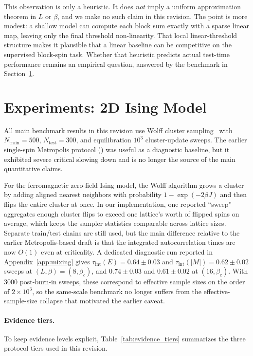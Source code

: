 \documentclass[12pt,a4paper]{memoir}
\begin{document}
This observation is only a heuristic.  It does \emph{not} imply a uniform
approximation theorem in $L$ or $\beta$, and we make no such claim in this
revision.  The point is more modest: a shallow model can compute each block sum
exactly with a sparse linear map, leaving only the final threshold
non-linearity.  That local linear-threshold structure makes it plausible that a
linear baseline can be competitive on the supervised block-spin task.
Whether that heuristic predicts actual test-time performance remains an
empirical question, answered by the benchmark in Section~\ref{sec:ising_exp}.

\section{Experiments: 2D Ising Model}
\label{sec:ising_exp}

All main benchmark results in this revision use Wolff cluster
sampling~\citep{wolff1989,swendsen1987,sokal1997,newman1999,binder2010} with
$N_{\mathrm{train}}=500$, $N_{\mathrm{test}}=300$, and equilibration $10^3$
cluster-update sweeps.  The earlier single-spin Metropolis protocol
(\citealp{metropolis1953,hastings1970}) was useful as a diagnostic baseline,
but it exhibited severe critical slowing down and is no longer the source of
the main quantitative claims.

For the ferromagnetic zero-field Ising model, the Wolff algorithm grows a
cluster by adding aligned nearest neighbors with probability
$1-\exp(-2\beta J)$ and then flips the entire cluster at once.  In our
implementation, one reported ``sweep'' aggregates enough cluster flips to
exceed one lattice's worth of flipped spins on average, which keeps the sampler
statistics comparable across lattice sizes.  Separate train/test chains are
still used, but the main difference relative to the earlier Metropolis-based
draft is that the integrated autocorrelation times are now $O(1)$ even at
criticality.  A dedicated diagnostic run reported in Appendix~\ref{app:mixing}
gives $\tau_{\mathrm{int}}(E)=0.64 \pm 0.03$ and
$\tau_{\mathrm{int}}(|M|)=0.62 \pm 0.02$ sweeps at $(L,\beta)=(8,\beta_c)$, and
$0.74 \pm 0.03$ and $0.61 \pm 0.02$ at $(16,\beta_c)$.  With 3000 post-burn-in
sweeps, these correspond to effective sample sizes on the order of
$2\times 10^3$, so the same-scale benchmark no longer suffers from the
effective-sample-size collapse that motivated the earlier caveat.

\paragraph{Evidence tiers.}
To keep evidence levels explicit, Table~\ref{tab:evidence_tiers} summarizes the
three protocol tiers used in this revision.
\end{document}

